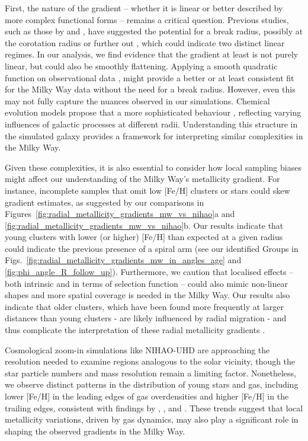 \documentclass[fleqn,usenatbib]{mnras}
\begin{document}
First, the nature of the gradient -- whether it is linear or better described by more complex functional forms -- remains a critical question. Previous studies, such as those by \citet{Lepine2011} and \citet{Donor2020}, have suggested the potential for a break radius, possibly at the corotation radius or further out \citep{Scarano2013}, which could indicate two distinct linear regimes. In our analysis, we find evidence that the gradient at least is not purely linear, but could also be smoothly flattening. Applying a smooth quadratic function on observational data \citep{Yong2012, Andrievsky2004, Genovali2014}, might provide a better or at least consistent fit for the Milky Way data without the need for a break radius. However, even this may not fully capture the nuances observed in our simulations. Chemical evolution models propose that a more sophisticated behaviour \citep[e.g.][]{Chiappini2001, Kubryk2015, Palla2024}, reflecting varying influences of galactic processes at different radii. Understanding this structure in the simulated galaxy provides a framework for interpreting similar complexities in the Milky Way.

Given these complexities, it is also essential to consider how local sampling biases might affect our understanding of the Milky Way's metallicity gradient. For instance, incomplete samples that omit low [Fe/H] clusters or stars could skew gradient estimates, as suggested by our comparisons in Figures~\ref{fig:radial_metallicity_gradients_mw_vs_nihao}a and \ref{fig:radial_metallicity_gradients_mw_vs_nihao}b. Our results indicate that young clusters with lower (or higher) [Fe/H] than expected at a given radius could indicate the previous presence of a spiral arm (see our identified Groups in Figs.~\ref{fig:radial_metallicity_gradients_mw_in_angles_age} and \ref{fig:phi_angle_R_follow_up}). Furthermore, we caution that localised effects -- both intrinsic and in terms of selection function -- could also mimic non-linear shapes and more spatial coverage is needed in the Milky Way. Our results also indicate that older clusters, which have been found more frequently at larger distances than young clusters - are likely influenced by radial migration - and thus complicate the interpretation of these radial metallicity gradients \citep{Magrini2009, Lepine2011}.

Cosmological zoom-in simulations like NIHAO-UHD are approaching the resolution needed to examine regions analogous to the solar vicinity, though the star particle numbers and mass resolution remain a limiting factor. Nonetheless, we observe distinct patterns in the distribution of young stars and gas, including lower [Fe/H] in the leading edges of gas overdensities and higher [Fe/H] in the trailing edges, consistent with findings by \citet{Grand2016}, \citet{Ho2017c}, and \citet{Kreckel2019}. These trends suggest that local metallicity variations, driven by gas dynamics, may also play a significant role in shaping the observed gradients in the Milky Way.
\end{document}
